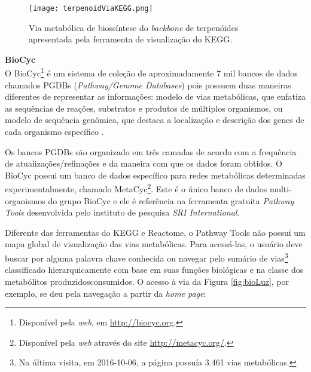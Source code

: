\break

\begin{figure}[!h]
\centering
\texttt{[image: terpenoidViaKEGG.png]}
\caption{Via metabólica de biossíntese do \textit{backbone} de terpenóides apresentada pela ferramenta de visualização do KEGG.}
\label{terpenoidBackboneKEGG}
\end{figure}

\newpage


\textbf{BioCyc} \\

\indent O BioCyc\footnote{Disponível pela \textit{web}, em \url{http://biocyc.org}.} é um sistema de coleção de aproximadamente 7 mil bancos de dados chamados PGDBs (\textit{Pathway/Genome Databases}) pois possuem duas maneiras diferentes de representar as informações: modelo de vias metabólicas, que enfatiza as sequências de reações, substratos e produtos de múltiplos organismos, ou modelo de sequência genômica, que destaca a localização e descrição dos genes de cada organismo específico \cite{biocycIntro}. 

\indent Os bancos PGDBs são organizado em três camadas de acordo com a frequência de atualizações/refinações e da maneira com que os dados foram obtidos. O BioCyc possui um banco de dados específico para redes metabólicas determinadas experimentalmente, chamado MetaCyc\footnote{Disponível pela \textit{web} através do site \url{http://metacyc.org/}.}. Este é o único banco de dados multi-organismos do grupo BioCyc e ele é referência na ferramenta gratuita \textit{Pathway Tools} desenvolvida pelo instituto de pesquisa \textit{SRI International}.

\indent Diferente das ferramentas do KEGG e Reactome, o Pathway  Tools não possui um mapa global de visualização das vias metabólicas. Para acessá-las, o usuário deve buscar por alguma palavra chave conhecida ou navegar pelo sumário de vias\footnote{Na última visita, em 2016-10-06, a página possuía 3.461 vias metabólicas.} classificado hierarquicamente com base em suas funções biológicas e na classe dos metabólitos produzidos\/consumidos. O acesso à via da Figura \ref{fig:bioLuz}, por exemplo, se deu pela navegação a partir da \textit{home page}: \\

